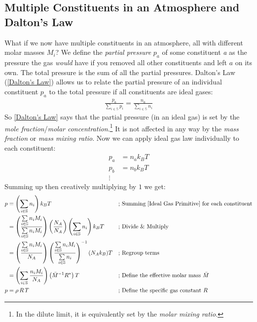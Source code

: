 \subsection{Multiple Constituents in an Atmosphere and Dalton's Law}\label{Multiple}

What if we now have multiple constituents in an atmosphere, all with different molar masses $M_i$? We define the \textit{partial pressure} $p_a$ of some constituent \textit{a} as the pressure the gas \textit{would} have if you removed all other constituents and left $a$ on its own. The total pressure is the sum of all the partial pressures. Dalton's Law (\ref{Dalton's Law}) allows us to relate the partial pressure of an individual constituent $p_a$ to the total pressure if all constituents are ideal gases:
\begin{align}\label{Dalton's Law}
    \frac{p_a}{\sum\limits_{i\in\mathbb{S}} p_i}=\frac{n_a}{\sum\limits_{i\in\mathbb{S}} n_i}
\end{align}
So \ref{Dalton's Law} says that the partial pressure (in an ideal gas) is set by the \textit{mole fraction}/\textit{molar concentration}.\footnote{In the dilute limit, it is equivalently set by the \textit{molar mixing ratio}.} It is not affected in any way by the \textit{mass fraction} or \textit{mass mixing ratio}. Now we can apply ideal gas law individually to each constituent:
\begin{align*}
    p_a&=n_ak_BT\\
    p_b&=n_bk_BT\\
    \vdots
\end{align*}
Summing up then creatively multiplying by $1$ we get:
\begin{align*}
    p&=\left(\sum\limits_{i\in\mathbb{S}} n_i\right)k_BT
    &\text{; }&\text{Summing \ref{Ideal Gas Primitive} for each constituent}
    \\
    &= \left(\frac{\sum\limits_{i\in\mathbb{S}} n_iM_i}{\sum\limits_{i\in\mathbb{S}} n_iM_i}\right)\left(\frac{N_A}{N_A}\right)\left(\sum\limits_{i\in\mathbb{S}} n_i\right)k_BT
    &\text{; }&\text{Divide \& Multiply}
    \\
    &= \left(\frac{\sum\limits_{i\in\mathbb{S}} n_iM_i}{N_A}\right)\left(\frac{\sum\limits_{i\in\mathbb{S}} n_iM_i}{\sum\limits_{i\in\mathbb{S}} n_i}\right)^{-1}(N_Ak_B)T
    &\text{; }&\text{Regroup terms}
    \\
    &=\left(\sum\limits_{i\in\mathbb{S}}\frac{n_iM_i}{N_A}\right)\left(\bar{M}^{-1}R^*\right)T 
    &\text{; }&\text{Define the effective molar mass }\bar{M}
    \\
    p&=\rho\, R \,T
    &\text{; }&\text{Define the specific gas constant $R$}
\end{align*}
